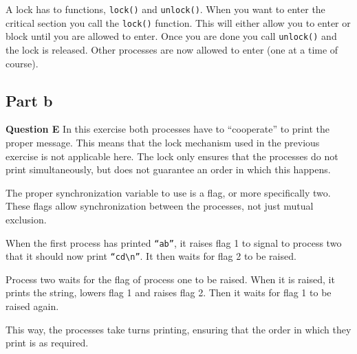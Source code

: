 \documentclass[a4paper]{article}
\begin{document}
A lock has to functions, \texttt{lock()} and \texttt{unlock()}. When you want to enter the
critical section you call the \texttt{lock()} function. This will either allow you to
enter or block until you are allowed to enter. Once you are done you call
\texttt{unlock()} and the lock is released. Other processes are now allowed to enter (one
at a time of course).

\subsection{Part b}
\textbf{Question E} In this exercise both processes have to ``cooperate'' to print the
proper message. This means that the lock mechanism used in the previous exercise is not
applicable here. The lock only ensures that the processes do not print simultaneously, but
does not guarantee an order in which this happens.

The proper synchronization variable to use is a flag, or more specifically two. These 
flags allow synchronization between the processes, not just mutual exclusion.

When the first process has printed \texttt{``ab''}, it raises flag 1 to signal to process
two that it should now print \texttt{``cd\textbackslash n''}. It then waits for flag 2 to
be raised.

Process two waits for the flag of process one to be raised. When it is raised, it prints
the string, lowers flag 1 and raises flag 2. Then it waits for flag 1 to be raised again.

This way, the processes take turns printing, ensuring that the order in which they print
is as required.
\end{document}
